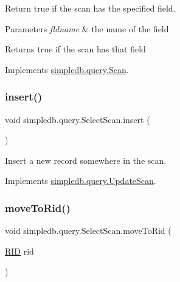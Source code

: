 Return true if the scan has the specified field. 
\begin{DoxyParams}{Parameters}
{\em fldname} & the name of the field \\
\hline
\end{DoxyParams}
\begin{DoxyReturn}{Returns}
true if the scan has that field 
\end{DoxyReturn}


Implements \hyperlink{interfacesimpledb_1_1query_1_1Scan_a8f4ccf13eed0bed983c928e9b998fe5c}{simpledb.\+query.\+Scan}.

\mbox{\label{classsimpledb_1_1query_1_1SelectScan_aef5c943c4a905265c588913e2f9958c2}} 
\subsubsection{\texorpdfstring{insert()}{insert()}}
{\footnotesize\ttfamily void simpledb.\+query.\+Select\+Scan.\+insert (\begin{DoxyParamCaption}{ }\end{DoxyParamCaption})\hspace{0.3cm}{\ttfamily [inline]}}

Insert a new record somewhere in the scan. 

Implements \hyperlink{interfacesimpledb_1_1query_1_1UpdateScan_a6a281cd50f596c008e868bddd0534774}{simpledb.\+query.\+Update\+Scan}.

\mbox{\label{classsimpledb_1_1query_1_1SelectScan_ae2a640b4e49eb8cb5fef5f48103dca3e}} 
\subsubsection{\texorpdfstring{move\+To\+Rid()}{moveToRid()}}
{\footnotesize\ttfamily void simpledb.\+query.\+Select\+Scan.\+move\+To\+Rid (\begin{DoxyParamCaption}\item[{\hyperlink{classsimpledb_1_1record_1_1RID}{R\+ID}}]{rid }\end{DoxyParamCaption})\hspace{0.3cm}{\ttfamily [inline]}}

